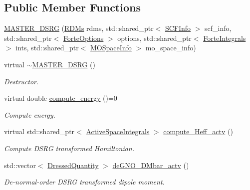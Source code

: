 \subsection*{Public Member Functions}
\begin{DoxyCompactItemize}
\item 
\mbox{\hyperlink{classforte_1_1_m_a_s_t_e_r___d_s_r_g_a21886b18bc2dc37dd53accc580de0a06}{M\+A\+S\+T\+E\+R\+\_\+\+D\+S\+RG}} (\mbox{\hyperlink{classforte_1_1_r_d_ms}{R\+D\+Ms}} rdms, std\+::shared\+\_\+ptr$<$ \mbox{\hyperlink{classforte_1_1_s_c_f_info}{S\+C\+F\+Info}} $>$ scf\+\_\+info, std\+::shared\+\_\+ptr$<$ \mbox{\hyperlink{classforte_1_1_forte_options}{Forte\+Options}} $>$ options, std\+::shared\+\_\+ptr$<$ \mbox{\hyperlink{classforte_1_1_forte_integrals}{Forte\+Integrals}} $>$ ints, std\+::shared\+\_\+ptr$<$ \mbox{\hyperlink{classforte_1_1_m_o_space_info}{M\+O\+Space\+Info}} $>$ mo\+\_\+space\+\_\+info)
\item 
virtual \mbox{\hyperlink{classforte_1_1_m_a_s_t_e_r___d_s_r_g_a7e54a251f3d0b282a57ffa73a0983bc2}{$\sim$\+M\+A\+S\+T\+E\+R\+\_\+\+D\+S\+RG}} ()
\begin{DoxyCompactList}\small\item\em Destructor. \end{DoxyCompactList}\item 
virtual double \mbox{\hyperlink{classforte_1_1_m_a_s_t_e_r___d_s_r_g_a34011aaadcc79224071a4266a095591b}{compute\+\_\+energy}} ()=0
\begin{DoxyCompactList}\small\item\em Compute energy. \end{DoxyCompactList}\item 
virtual std\+::shared\+\_\+ptr$<$ \mbox{\hyperlink{classforte_1_1_active_space_integrals}{Active\+Space\+Integrals}} $>$ \mbox{\hyperlink{classforte_1_1_m_a_s_t_e_r___d_s_r_g_a4c4e581766abada72d8e1742a7887d2a}{compute\+\_\+\+Heff\+\_\+actv}} ()
\begin{DoxyCompactList}\small\item\em Compute D\+S\+RG transformed Hamiltonian. \end{DoxyCompactList}\item 
std\+::vector$<$ \mbox{\hyperlink{classforte_1_1_dressed_quantity}{Dressed\+Quantity}} $>$ \mbox{\hyperlink{classforte_1_1_m_a_s_t_e_r___d_s_r_g_a8fba974b17fe78a6646402144d388e76}{de\+G\+N\+O\+\_\+\+D\+Mbar\+\_\+actv}} ()
\begin{DoxyCompactList}\small\item\em De-\/normal-\/order D\+S\+RG transformed dipole moment. \end{DoxyCompactList}\item 

\end{DoxyCompactItemize}
